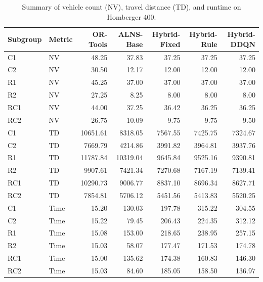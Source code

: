 \begin{table}[htbp]
\centering
\caption{Summary of vehicle count (NV), travel distance (TD), and runtime on Homberger 400.}
\label{tab:results_homberger_400}
\begin{tabular}{llrrrrr}
\hline
\textbf{Subgroup} & \textbf{Metric} & \textbf{OR-Tools} & \textbf{ALNS-Base} & \textbf{Hybrid-Fixed} & \textbf{Hybrid-Rule} & \textbf{Hybrid-DDQN} \\ \hline
C1 & NV & 48.25 & 37.83 & 37.25 & 37.25 & 37.25 \\
C2 & NV & 30.50 & 12.17 & 12.00 & 12.00 & 12.00 \\
R1 & NV & 45.25 & 37.00 & 37.00 & 37.00 & 37.00 \\
R2 & NV & 27.25 & 8.25 & 8.00 & 8.00 & 8.00 \\
RC1 & NV & 44.00 & 37.25 & 36.42 & 36.25 & 36.25 \\
RC2 & NV & 26.75 & 10.09 & 9.75 & 9.75 & 9.50 \\
C1 & TD & 10651.61 & 8318.05 & 7567.55 & 7425.75 & 7324.67 \\
C2 & TD & 7669.79 & 4214.86 & 3991.82 & 3964.81 & 3937.76 \\
R1 & TD & 11787.84 & 10319.04 & 9645.84 & 9525.16 & 9390.81 \\
R2 & TD & 9907.61 & 7421.34 & 7270.68 & 7167.19 & 7139.41 \\
RC1 & TD & 10290.73 & 9006.77 & 8837.10 & 8696.34 & 8627.71 \\
RC2 & TD & 7854.81 & 5706.12 & 5451.56 & 5413.83 & 5520.25 \\
C1 & Time & 15.20 & 130.03 & 197.78 & 315.22 & 304.55 \\
C2 & Time & 15.22 & 79.45 & 206.43 & 224.35 & 312.12 \\
R1 & Time & 15.08 & 153.00 & 218.65 & 238.95 & 257.15 \\
R2 & Time & 15.03 & 58.07 & 177.47 & 171.53 & 174.78 \\
RC1 & Time & 15.00 & 135.62 & 174.38 & 160.83 & 146.30 \\
RC2 & Time & 15.03 & 84.60 & 185.05 & 158.50 & 136.97 \\
\hline
\end{tabular}
\end{table}

